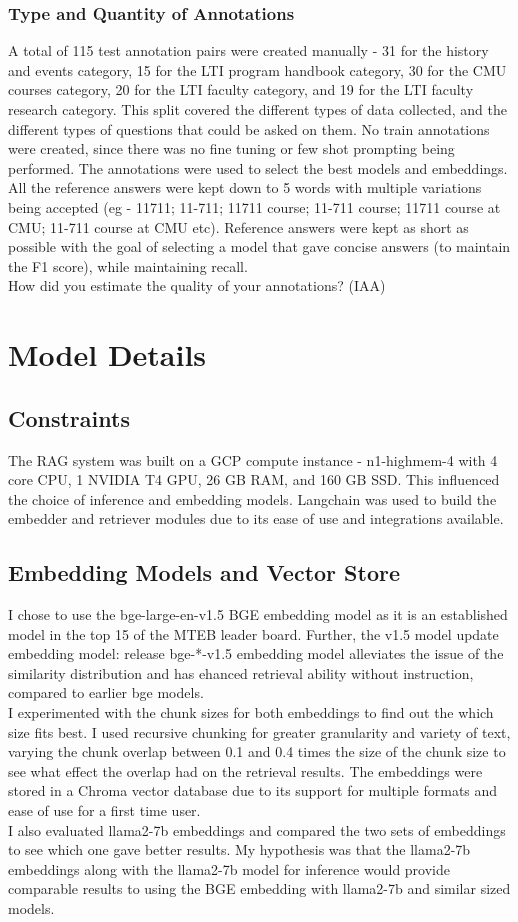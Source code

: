 \documentclass[11pt]{article}
\begin{document}
\subsubsection{Type and Quantity of Annotations}
A total of 115 test annotation pairs were created manually - 31 for the history and events category, 15 for the LTI program handbook category, 30 for the CMU courses category, 20 for the LTI faculty category, and 19 for the LTI faculty research category.
This split covered the different types of data collected, and the different types of questions that could be asked on them. No train annotations were created, since there was no fine tuning or few shot prompting being performed. The annotations were used to select the best models and embeddings.
All the reference answers were kept down to 5 words with multiple variations being accepted (eg - 11711; 11-711; 11711 course; 11-711 course; 11711 course at CMU; 11-711 course at CMU etc). Reference answers were kept as short as possible with the goal of selecting a model that gave concise answers (to maintain the F1 score), while maintaining recall.
\\ How did you estimate the quality of your annotations? (IAA)

\section{Model Details}

\subsection{Constraints}
The RAG system was built on a GCP compute instance - n1-highmem-4 with 4 core CPU, 1 NVIDIA T4 GPU, 26 GB RAM, and 160 GB SSD. This influenced the choice of inference and embedding models.
Langchain was used to build the embedder and retriever modules due to its ease of use and integrations available.
\subsection{Embedding Models and Vector Store}
I chose to use the bge-large-en-v1.5 BGE embedding model as it is an established model in the top 15 of the MTEB leader board. Further, the v1.5 model update embedding model: release bge-*-v1.5 embedding model alleviates the issue of the similarity distribution and has ehanced retrieval ability without instruction, compared to earlier bge models.
\\
I experimented with the chunk sizes for both embeddings to find out the which size fits best.
I used recursive chunking for greater granularity and variety of text, varying the chunk overlap between 0.1 and 0.4 times the size of the chunk size to see what effect the overlap had on the retrieval results.  The embeddings were stored in a Chroma vector database due to its support for multiple formats and ease of use for a first time user.
\\
I also evaluated llama2-7b embeddings and compared the two sets of embeddings to see which one gave better results. My hypothesis was that the llama2-7b embeddings along with the llama2-7b model for inference would provide comparable results to using the BGE embedding with llama2-7b and similar sized models.
\end{document}
